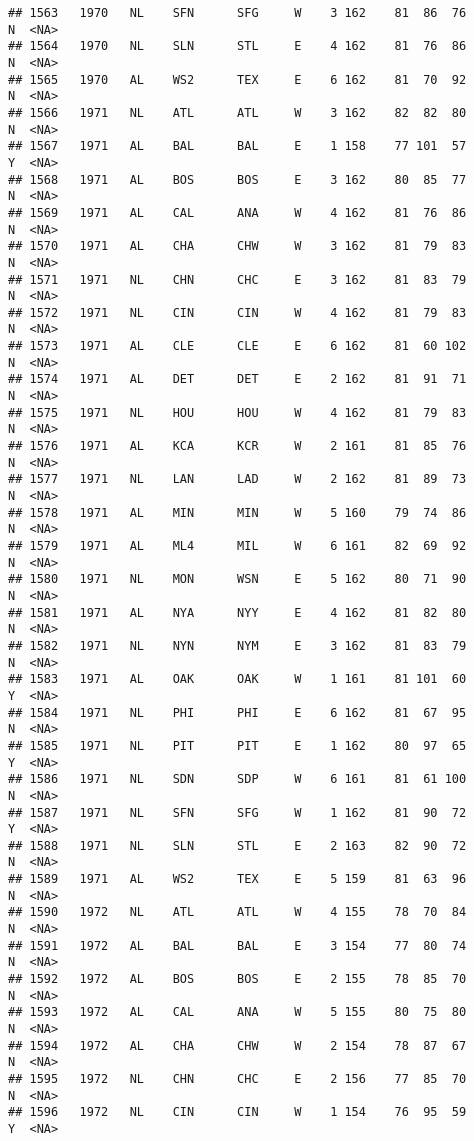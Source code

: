 \documentclass[]{article}
\begin{document}
\begin{verbatim}
## 1563   1970   NL    SFN      SFG     W    3 162    81  86  76      N  <NA>
## 1564   1970   NL    SLN      STL     E    4 162    81  76  86      N  <NA>
## 1565   1970   AL    WS2      TEX     E    6 162    81  70  92      N  <NA>
## 1566   1971   NL    ATL      ATL     W    3 162    82  82  80      N  <NA>
## 1567   1971   AL    BAL      BAL     E    1 158    77 101  57      Y  <NA>
## 1568   1971   AL    BOS      BOS     E    3 162    80  85  77      N  <NA>
## 1569   1971   AL    CAL      ANA     W    4 162    81  76  86      N  <NA>
## 1570   1971   AL    CHA      CHW     W    3 162    81  79  83      N  <NA>
## 1571   1971   NL    CHN      CHC     E    3 162    81  83  79      N  <NA>
## 1572   1971   NL    CIN      CIN     W    4 162    81  79  83      N  <NA>
## 1573   1971   AL    CLE      CLE     E    6 162    81  60 102      N  <NA>
## 1574   1971   AL    DET      DET     E    2 162    81  91  71      N  <NA>
## 1575   1971   NL    HOU      HOU     W    4 162    81  79  83      N  <NA>
## 1576   1971   AL    KCA      KCR     W    2 161    81  85  76      N  <NA>
## 1577   1971   NL    LAN      LAD     W    2 162    81  89  73      N  <NA>
## 1578   1971   AL    MIN      MIN     W    5 160    79  74  86      N  <NA>
## 1579   1971   AL    ML4      MIL     W    6 161    82  69  92      N  <NA>
## 1580   1971   NL    MON      WSN     E    5 162    80  71  90      N  <NA>
## 1581   1971   AL    NYA      NYY     E    4 162    81  82  80      N  <NA>
## 1582   1971   NL    NYN      NYM     E    3 162    81  83  79      N  <NA>
## 1583   1971   AL    OAK      OAK     W    1 161    81 101  60      Y  <NA>
## 1584   1971   NL    PHI      PHI     E    6 162    81  67  95      N  <NA>
## 1585   1971   NL    PIT      PIT     E    1 162    80  97  65      Y  <NA>
## 1586   1971   NL    SDN      SDP     W    6 161    81  61 100      N  <NA>
## 1587   1971   NL    SFN      SFG     W    1 162    81  90  72      Y  <NA>
## 1588   1971   NL    SLN      STL     E    2 163    82  90  72      N  <NA>
## 1589   1971   AL    WS2      TEX     E    5 159    81  63  96      N  <NA>
## 1590   1972   NL    ATL      ATL     W    4 155    78  70  84      N  <NA>
## 1591   1972   AL    BAL      BAL     E    3 154    77  80  74      N  <NA>
## 1592   1972   AL    BOS      BOS     E    2 155    78  85  70      N  <NA>
## 1593   1972   AL    CAL      ANA     W    5 155    80  75  80      N  <NA>
## 1594   1972   AL    CHA      CHW     W    2 154    78  87  67      N  <NA>
## 1595   1972   NL    CHN      CHC     E    2 156    77  85  70      N  <NA>
## 1596   1972   NL    CIN      CIN     W    1 154    76  95  59      Y  <NA>

\end{verbatim}
\end{document}
